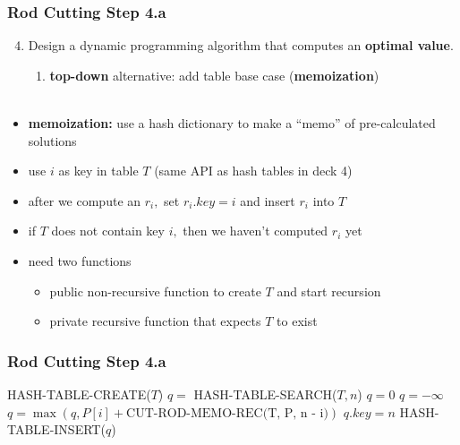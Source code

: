 \documentclass{beamer}
\newcommand{\stanza}{ \\~\ }
\begin{document}
\begin{frame} \frametitle{Rod Cutting Step 4.a}
  \begin{enumerate}
    \setcounter{enumi}{3}
    \item Design a dynamic programming algorithm that computes an \textbf{optimal value}.
    \begin{enumerate}
      \item \textbf{top-down} alternative: add table base case (\textbf{memoization})
      \stanza
    \end{enumerate}
\end{enumerate}

\begin{itemize}
  \item \textbf{memoization:} use a hash dictionary to make a ``memo'' of pre-calculated solutions
  \item use $i$ as key in table $T$ (same API as hash tables in deck 4)
  \item after we compute an $r_i,$ set $r_i.key = i$ and insert $r_i$ into $T$
  \item if $T$ does not contain key $i,$ then we haven't computed $r_i$ yet
  \item need two functions
  \begin{itemize}
    \item public non-recursive function to create $T$ and start recursion
    \item private recursive function that expects $T$ to exist
  \end{itemize}
\end{itemize}
\end{frame}

\begin{frame} \frametitle{Rod Cutting Step 4.a}
  {\scriptsize
  \begin{algorithmic}[1]
    \State HASH-TABLE-CREATE($T$)
    \State {}
    \EndFunction
    \State $q = $ HASH-TABLE-SEARCH($T, n$)
      \State {}
    \EndIf
      \State $q=0$
    \Else
      \State $q=-\infty$
        \State $q = \max(q, P[i] + \text{CUT-ROD-MEMO-REC(T, P, n - i)})$
      \EndFor
    \EndIf
    \State $q.key = n$
    \State HASH-TABLE-INSERT($q$)
    \State {}
    \EndFunction
  \end{algorithmic}
  }
\end{frame}
\end{document}
